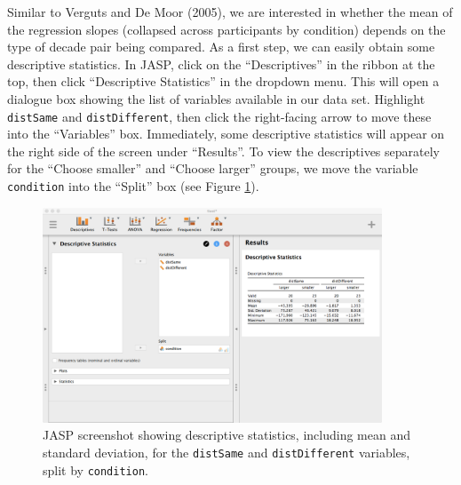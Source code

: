 \documentclass[english,,doc,floatsintext]{apa6}
\begin{document}
Similar to Verguts and De Moor (2005), we are interested in whether the mean of the regression slopes (collapsed across participants by condition) depends on the type of decade pair being compared. As a first step, we can easily obtain some descriptive statistics. In JASP, click on the ``Descriptives'' in the ribbon at the top, then click ``Descriptive Statistics'' in the dropdown menu. This will open a dialogue box showing the list of variables available in our data set. Highlight \texttt{distSame} and \texttt{distDifferent}, then click the right-facing arrow to move these into the ``Variables'' box. Immediately, some descriptive statistics will appear on the right side of the screen under ``Results''. To view the descriptives separately for the ``Choose smaller'' and ``Choose larger'' groups, we move the variable \texttt{condition} into the ``Split'' box (see Figure \ref{fig:ttestDescriptives}).

\begin{figure}
\centering
\includegraphics[width=0.9\textwidth,height=\textheight]{figures/ttestDescriptives.png}
\caption{\label{fig:ttestDescriptives}JASP screenshot showing descriptive statistics, including mean and standard deviation, for the \texttt{distSame} and \texttt{distDifferent} variables, split by \texttt{condition}.}
\end{figure}
\end{document}
